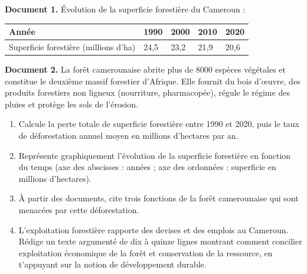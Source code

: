 \documentclass[11pt]{article}
\begin{document}
\begin{exercice}
\textbf{Document 1.} Évolution de la superficie forestière du Cameroun :

\begin{center}
\begin{tabularx}{\linewidth}{|l|X|X|X|X|}\hline
\rowcolor{popblueL} \textbf{Année} & 1990 & 2000 & 2010 & 2020 \\ \hline
Superficie forestière (millions d'ha) & 24,5 & 23,2 & 21,9 & 20,6 \\ \hline
\end{tabularx}
\end{center}

\textbf{Document 2.} La forêt camerounaise abrite plus de \num{8000} espèces végétales et constitue le deuxième massif forestier d'Afrique. Elle fournit du bois d'œuvre, des produits forestiers non ligneux (nourriture, pharmacopée), régule le régime des pluies et protège les sols de l'érosion.

\begin{enumerate}
\item Calcule la perte totale de superficie forestière entre 1990 et 2020, puis le taux de déforestation annuel moyen en millions d'hectares par an.
\item Représente graphiquement l'évolution de la superficie forestière en fonction du temps (axe des abscisses : années ; axe des ordonnées : superficie en millions d'hectares).
\item À partir des documents, cite trois fonctions de la forêt camerounaise qui sont menacées par cette déforestation.
\item L'exploitation forestière rapporte des devises et des emplois au Cameroun. Rédige un texte argumenté de dix à quinze lignes montrant comment concilier exploitation économique de la forêt et conservation de la ressource, en t'appuyant sur la notion de développement durable.
\end{enumerate}
\end{exercice}
\end{document}
